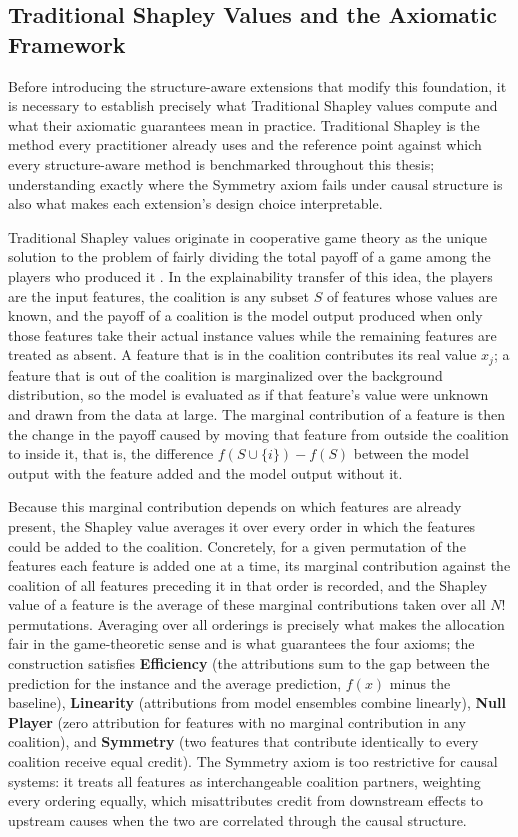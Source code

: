 \documentclass[12pt,a4paper,oneside]{article}
\begin{document}
\subsection{Traditional Shapley Values and the Axiomatic Framework}

Before introducing the structure-aware extensions that modify this foundation, it is necessary to establish precisely what Traditional Shapley values compute and what their axiomatic guarantees mean in practice. Traditional Shapley is the method every practitioner already uses and the reference point against which every structure-aware method is benchmarked throughout this thesis; understanding exactly where the Symmetry axiom fails under causal structure is also what makes each extension's design choice interpretable.

Traditional Shapley values originate in cooperative game theory as the unique solution to the problem of fairly dividing the total payoff of a game among the players who produced it \citep{Shapley1953}. In the explainability transfer of this idea, the players are the input features, the coalition is any subset $S$ of features whose values are known, and the payoff of a coalition is the model output produced when only those features take their actual instance values while the remaining features are treated as absent. A feature that is in the coalition contributes its real value $x_j$; a feature that is out of the coalition is marginalized over the background distribution, so the model is evaluated as if that feature's value were unknown and drawn from the data at large. The marginal contribution of a feature is then the change in the payoff caused by moving that feature from outside the coalition to inside it, that is, the difference $f(S \cup \{i\}) - f(S)$ between the model output with the feature added and the model output without it.

Because this marginal contribution depends on which features are already present, the Shapley value averages it over every order in which the features could be added to the coalition. Concretely, for a given permutation of the features each feature is added one at a time, its marginal contribution against the coalition of all features preceding it in that order is recorded, and the Shapley value of a feature is the average of these marginal contributions taken over all $N!$ permutations. Averaging over all orderings is precisely what makes the allocation fair in the game-theoretic sense and is what guarantees the four axioms; the construction satisfies \textbf{Efficiency} (the attributions sum to the gap between the prediction for the instance and the average prediction, $f(x)$ minus the baseline), \textbf{Linearity} (attributions from model ensembles combine linearly), \textbf{Null Player} (zero attribution for features with no marginal contribution in any coalition), and \textbf{Symmetry} (two features that contribute identically to every coalition receive equal credit). The Symmetry axiom is too restrictive for causal systems: it treats all features as interchangeable coalition partners, weighting every ordering equally, which misattributes credit from downstream effects to upstream causes when the two are correlated through the causal structure.
\end{document}
